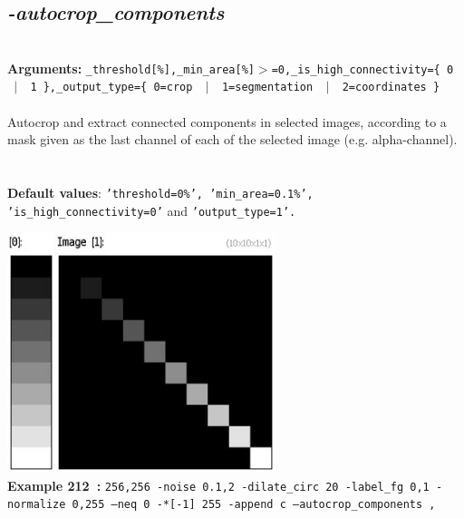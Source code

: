 \documentclass[a4paper,11pt,twoside]{book}
\begin{document}
\subsection{\emph{-autocrop\_components} }\vspace*{-0.5em}
~\\\textbf{Arguments: } 
{\small \texttt{\_threshold[\%],\_min\_area[\%]$>$=0,\_is\_high\_connectivity=\{ 0 ~$|$~ 1 \},\_output\_type=\{ 0=crop ~$|$~ 1=segmentation ~$|$~ 2=coordinates \}}}\\~\\
Autocrop and extract connected components in selected images, according to a mask given as the last channel of
each of the selected image (e.g. alpha-channel).
~\\~\\\textbf{Default values}: {\small \texttt{'threshold=0\%', 'min\_area=0.1\%', 'is\_high\_connectivity=0'} and \texttt{'output\_type=1'.}}
\begin{center}\includegraphics[keepaspectratio=true,height=7cm,width=\textwidth]{img/gmic_def212.jpg}\\
{\footnotesize \textbf{Example 212~:} \texttt{256,256 -noise 0.1,2 -dilate\_circ 20 -label\_fg 0,1 -normalize 0,255 --neq 0 -*[-1] 255 -append c --autocrop\_components ,}}
\end{center}
\end{document}
